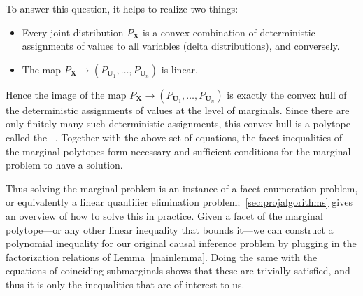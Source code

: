 To answer this question, it helps to realize two things:
\begin{itemize}
	\item Every joint distribution $P_{\bm{X}}$ is a convex combination of deterministic assignments of values to all variables (delta distributions), and conversely.
	\item The map $P_{\bm{X}}\to (P_{\bm{U}_1},\ldots,P_{\bm{U}_n})$ is linear.
\end{itemize}
Hence the image of the map $P_{\bm{X}}\to (P_{\bm{U}_1},\ldots,P_{\bm{U}_n})$ is exactly the convex hull of the deterministic assignments of values at the level of marginals. Since there are only finitely many such deterministic assignments, this convex hull is a polytope called the ~\cite{kahle_marginal_2010}. Together with the above set of equations, the facet inequalities of the marginal polytopes form necessary and sufficient conditions for the marginal problem to have a solution.

Thus solving the marginal problem is an instance of a facet enumeration problem, or equivalently a linear quantifier elimination problem;~\cref{sec:projalgorithms} gives an overview of how to solve this in practice. Given a facet of the marginal polytope---or any other linear inequality that bounds it---we can construct a polynomial inequality for our original causal inference problem by plugging in the factorization relations of Lemma~\ref{mainlemma}. Doing the same with the equations of coinciding submarginals shows that these are trivially satisfied, and thus it is only the inequalities that are of interest to us.


